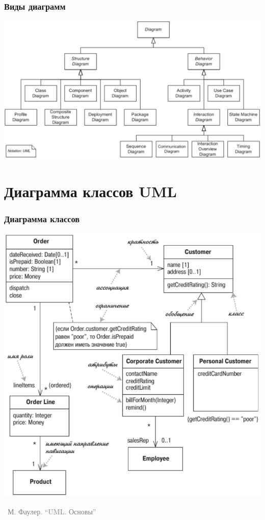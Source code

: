 \documentclass[xetex,mathserif,serif]{beamer}
\newcommand{\attribution}[1] {
    \vspace{-5mm}\begin{flushright}\begin{scriptsize}\textcolor{gray}{\textcopyright\, #1}\end{scriptsize}\end{flushright}
}
\begin{document}
    \begin{frame}
        \frametitle{Виды диаграмм}
        \begin{center}
            \includegraphics[width=\textwidth]{umlDiagrams.png}
        \end{center}
    \end{frame}

    \section{Диаграмма классов UML}

    \begin{frame}
        \frametitle{Диаграмма классов}
        \begin{center}
            \includegraphics[height=0.8\textheight]{umlClassDiagram.png}
            \attribution{М. Фаулер. ``UML. Основы''}
        \end{center}
    \end{frame}
\end{document}
